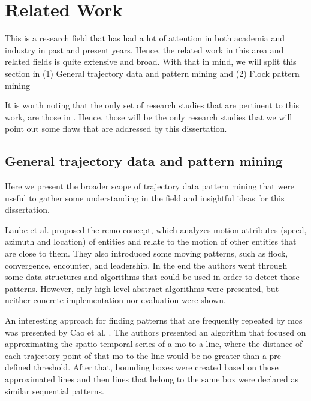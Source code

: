 \chapter{Related Work}
\label{chp:relatedwork}
This is a research field that has had a lot of attention in both academia and industry in past and present years. Hence,
the related work in this area and related fields is quite extensive and broad. With that in mind, we will split this
section in (1) General trajectory data and pattern mining and (2) Flock pattern mining

It is worth noting that the only set of research studies that are pertinent to this work, are those in
. Hence, those will be the only research studies that we will point out some flaws that are
addressed by this dissertation.

\section{General trajectory data and pattern mining}
\label{sec:rel_general}
Here we present the broader scope of trajectory data pattern mining that were useful to gather some understanding in the
field and insightful ideas for this dissertation.

Laube et al. \citep{remo} proposed the \ac{remo} concept, which analyzes motion attributes (speed, azimuth and location)
of entities and relate to the motion of other entities that are close to them. They also introduced some moving
patterns, such as flock, convergence, encounter, and leadership. In the end the authors went through some data
structures and algorithms that could be used in order to detect those patterns. However, only high level abstract
algorithms were presented, but neither concrete implementation nor evaluation were shown.

An interesting approach for finding patterns that are frequently repeated by \acp{mo} was presented by Cao et al.
\citep{frequentpatterns}. The authors presented an algorithm that focused on approximating the spatio-temporal series of
a \ac{mo} to a line, where the distance of each trajectory point of that \ac{mo} to the line would be no greater than a
pre-defined threshold. After that, bounding boxes were created based on those approximated lines and then lines that
belong to the same box were declared as similar sequential patterns.

